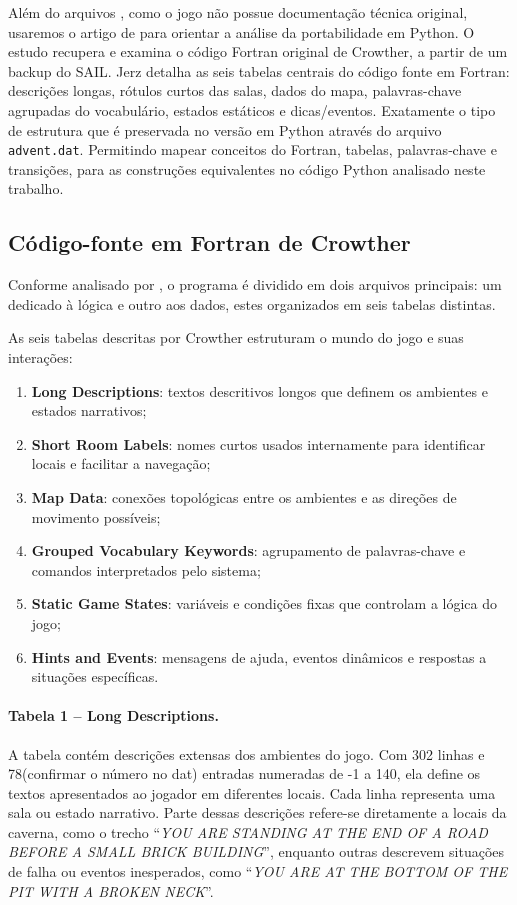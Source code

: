 \documentclass[12pt,a4paper]{article}
\begin{document}
Além do arquivos \textcite{adventure_original_sources}, como o jogo não possue documentação técnica original, usaremos o artigo de \textcite{jerz2007colossal} para orientar a análise da portabilidade em Python. O estudo recupera e examina o código Fortran original de Crowther, a partir de um backup do SAIL. Jerz detalha as seis tabelas centrais do código fonte em Fortran: descrições longas, rótulos curtos das salas, dados do mapa, palavras-chave agrupadas do vocabulário, estados estáticos e dicas/eventos. Exatamente o tipo de estrutura que é preservada no versão em Python através do arquivo \texttt{advent.dat}. Permitindo mapear conceitos do Fortran, tabelas, palavras‐chave e transições, para as construções equivalentes no código Python analisado neste trabalho.

\subsection{Código-fonte em Fortran de Crowther}

Conforme analisado por \textcite{jerz2007colossal}, o programa é dividido em dois arquivos principais: um dedicado à lógica e outro aos dados, estes organizados em seis tabelas distintas.

As seis tabelas descritas por Crowther estruturam o mundo do jogo e suas interações:
\begin{enumerate}
    \item \textbf{Long Descriptions}: textos descritivos longos que definem os ambientes e estados narrativos;
    \item \textbf{Short Room Labels}: nomes curtos usados internamente para identificar locais e facilitar a navegação;
    \item \textbf{Map Data}: conexões topológicas entre os ambientes e as direções de movimento possíveis;
    \item \textbf{Grouped Vocabulary Keywords}: agrupamento de palavras-chave e comandos interpretados pelo sistema;
    \item \textbf{Static Game States}: variáveis e condições fixas que controlam a lógica do jogo;
    \item \textbf{Hints and Events}: mensagens de ajuda, eventos dinâmicos e respostas a situações específicas.
\end{enumerate}

\paragraph{Tabela 1 – Long Descriptions.}  
A tabela contém descrições extensas dos ambientes do jogo. Com 302 linhas e 78(confirmar o número no dat) entradas numeradas de -1 a 140, ela define os textos apresentados ao jogador em diferentes locais. Cada linha representa uma sala ou estado narrativo. Parte dessas descrições refere-se diretamente a locais da caverna, como o trecho “\textit{YOU ARE STANDING AT THE END OF A ROAD BEFORE A SMALL BRICK BUILDING}”, enquanto outras descrevem situações de falha ou eventos inesperados, como “\textit{YOU ARE AT THE BOTTOM OF THE PIT WITH A BROKEN NECK}”.  
\end{document}
